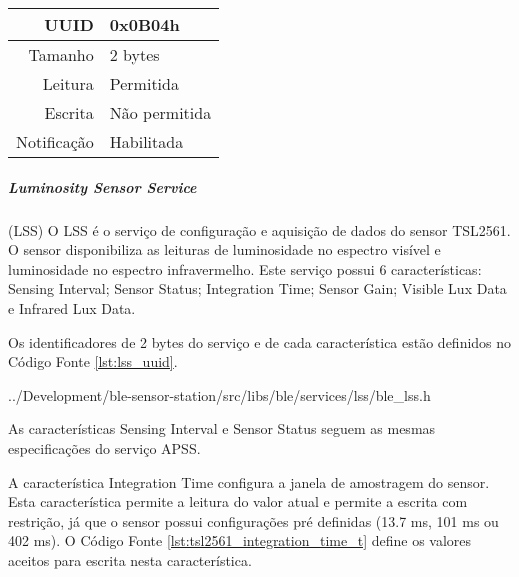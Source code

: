 \begin{tcolorbox}[arc=3mm,fontupper=\small,fonttitle=\bfseries,
subtitle style={boxrule=0.4pt, colback=white},colframe=green!25!black,
halign=center,bottom=0mm,
title=Temperature and Humidity Sensor Service]
\begin{tcbitemize}[raster columns=2,raster equal height,fontupper=\footnotesize,
	colbacktitle=yellow!100!red!100!black, coltitle=black,
	fonttitle=\footnotesize\bfseries,size=small, halign=center]
		\tcbitem [squeezed title={Humidity Data Characteristic}]
		\begin{tabular}{ r | l }
		UUID & 0x0B04h \\ \hline
		Tamanho & 2 bytes \\ \hline
		Leitura & Permitida \\ \hline
		Escrita & Não permitida \\ \hline
		Notificação & Habilitada 
		\end{tabular}		
	\end{tcbitemize}
	\tcblower
	\label{fig:resumo_thss}
\end{tcolorbox}

\newpage
\subparagraph{Luminosity Sensor Service}(LSS) 
\newline
O LSS é o serviço de configuração e aquisição de dados do sensor TSL2561. O
sensor disponibiliza as leituras de luminosidade no espectro visível e
luminosidade no espectro infravermelho. Este serviço possui 6 características:
Sensing Interval; Sensor Status; Integration Time; Sensor Gain; Visible Lux
Data e  Infrared Lux Data.

Os identificadores de 2 bytes do serviço e de cada característica estão
definidos no Código Fonte \ref{lst:lss_uuid}. 

\begin{minipage}{0.95\linewidth}

{../Development/ble-sensor-station/src/libs/ble/services/lss/ble_lss.h}
\end{minipage}

As características Sensing Interval e Sensor Status seguem as mesmas
especificações do serviço APSS.

A característica Integration Time configura a janela de amostragem do sensor.
Esta característica permite a leitura do valor atual e permite a escrita com
restrição, já que o sensor possui configurações pré definidas (13.7 ms, 101 ms
ou 402 ms). O Código Fonte \ref{lst:tsl2561_integration_time_t} define os
valores aceitos para escrita nesta característica. \cite{TSL2561Datasheet}

